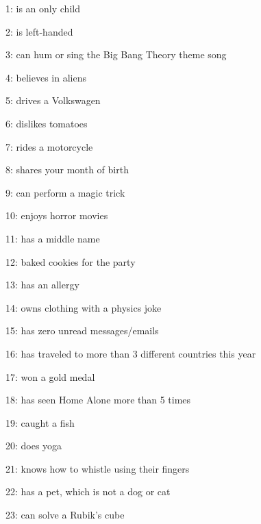 \item 1: is an only child\\
\item 2: is left-handed\\
\item 3: can hum or sing the Big Bang Theory theme song\\
\item 4: believes in aliens\\
\item 5: drives a Volkswagen\\
\item 6: dislikes tomatoes\\
\item 7: rides a motorcycle\\
\item 8: shares your month of birth\\
\item 9: can perform a magic trick\\
\item 10: enjoys horror movies\\
\item 11: has a middle name\\
\item 12: baked cookies for the party\\
\item 13: has an allergy\\
\item 14: owns clothing with a physics joke\\
\item 15: has zero unread messages/emails\\
\item 16: has traveled to more than 3 different countries this year\\
\item 17: won a gold medal\\
\item 18: has seen Home Alone more than 5 times\\
\item 19: caught a fish\\
\item 20: does yoga\\
\item 21: knows how to whistle using their fingers\\
\item 22: has a pet, which is not a dog or cat\\
\item 23: can solve a Rubik's cube\\

